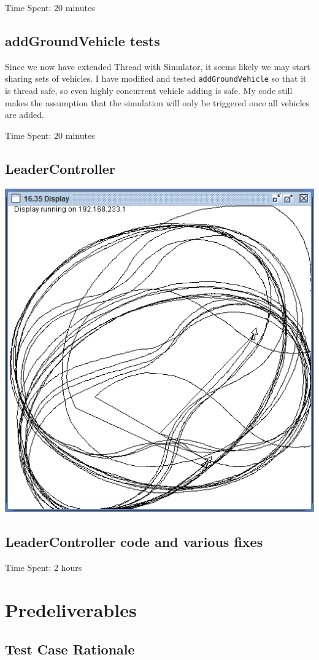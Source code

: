 \documentclass{article}
\begin{document}
Time Spent: 20 minutes

\subsection{addGroundVehicle tests}
Since we now have extended Thread with Simulator, it seems likely we may start sharing sets of vehicles.  I have modified and tested \verb|addGroundVehicle| so that it is thread safe, so even highly concurrent vehicle adding is safe.  My code still makes the assumption that the simulation will only be triggered once all vehicles are added.

Time Spent: 20 minutes

\subsection{LeaderController}
\begin{center}
\includegraphics[width=0.7\linewidth]{leader}
\end{center}

\subsection{LeaderController code and various fixes}
Time Spent: 2 hours



\section{Predeliverables}
\subsection{Test Case Rationale}
\end{document}
